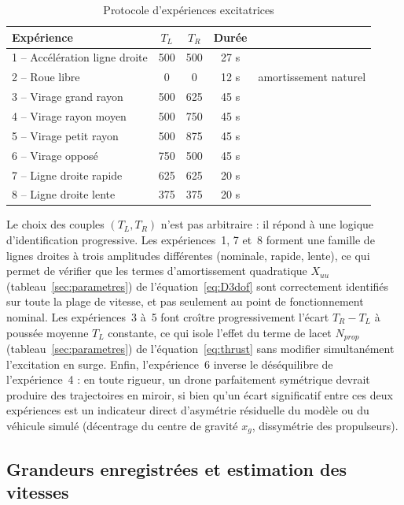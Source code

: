 \documentclass{rapportEILCO}
\begin{document}
	\begin{table}[H]
		\centering
		\caption{Protocole d'expériences excitatrices}
		\label{tab:exp}
		\begin{tabular}{lcccl}
			\toprule
			\textbf{Expérience} & $T_L$ & $T_R$ & \textbf{Durée}  \\
			\midrule
			1 -- Accélération ligne droite & 500 & 500 & 27 s  \\
			2 -- Roue libre & 0 & 0 & 12 s & amortissement naturel \\
			3 -- Virage grand rayon & 500 & 625 & 45 s  \\
			4 -- Virage rayon moyen & 500 & 750 & 45 s \\
			5 -- Virage petit rayon & 500 & 875 & 45 s\\
			6 -- Virage opposé & 750 & 500 & 45 s  \\
			7 -- Ligne droite rapide & 625 & 625 & 20 s  \\
			8 -- Ligne droite lente & 375 & 375 & 20 s \\
			\bottomrule
		\end{tabular}
	\end{table}
	
	Le choix des couples $(T_L, T_R)$ n'est pas arbitraire : il répond à une logique d'identification progressive. Les expériences~1, 7 et~8 forment une famille de lignes droites à trois amplitudes différentes (nominale, rapide, lente), ce qui permet de vérifier que les termes d'amortissement quadratique $X_{uu}$ (tableau~\ref{sec:parametres}) de l'équation~\eqref{eq:D3dof} sont correctement identifiés sur toute la plage de vitesse, et pas seulement au point de fonctionnement nominal. Les expériences~3 à~5 font croître progressivement l'écart $T_R - T_L$ à poussée moyenne $T_L$ constante, ce qui isole l'effet du terme de lacet $N_{prop}$ (tableau~\ref{sec:parametres}) de l'équation~\eqref{eq:thrust} sans modifier simultanément l'excitation en surge. Enfin, l'expérience~6 inverse le déséquilibre de l'expérience~4 : en toute rigueur, un drone parfaitement symétrique devrait produire des trajectoires en miroir, si bien qu'un écart significatif entre ces deux expériences est un indicateur direct d'asymétrie résiduelle du modèle ou du véhicule simulé (décentrage du centre de gravité $x_g$, dissymétrie des propulseurs).
	
	
	\subsection{Grandeurs enregistrées et estimation des vitesses}
	
\end{document}
